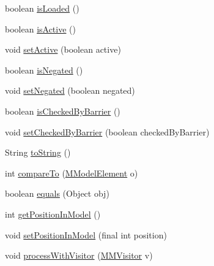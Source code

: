 \begin{DoxyCompactItemize}
\item 
boolean \hyperlink{classorg_1_1tzi_1_1use_1_1uml_1_1mm_1_1_m_class_invariant_aa6222605ae8ae2445dbf595195d75cd5}{is\-Loaded} ()
\item 
boolean \hyperlink{classorg_1_1tzi_1_1use_1_1uml_1_1mm_1_1_m_class_invariant_a9367bf1d958b1802cc3c4596fd547b74}{is\-Active} ()
\item 
void \hyperlink{classorg_1_1tzi_1_1use_1_1uml_1_1mm_1_1_m_class_invariant_a6545ffaa1a5b6d5d6109db60a520088a}{set\-Active} (boolean active)
\item 
boolean \hyperlink{classorg_1_1tzi_1_1use_1_1uml_1_1mm_1_1_m_class_invariant_a8d3e803f38fd9df1909512b6233e22a5}{is\-Negated} ()
\item 
void \hyperlink{classorg_1_1tzi_1_1use_1_1uml_1_1mm_1_1_m_class_invariant_ab48032170a88a4c9e8a4d839a2ac3619}{set\-Negated} (boolean negated)
\item 
boolean \hyperlink{classorg_1_1tzi_1_1use_1_1uml_1_1mm_1_1_m_class_invariant_a33e8cd4e797a8c7a1c43028661dc38a4}{is\-Checked\-By\-Barrier} ()
\item 
void \hyperlink{classorg_1_1tzi_1_1use_1_1uml_1_1mm_1_1_m_class_invariant_a9c54908eddd23901466c190613dfd222}{set\-Checked\-By\-Barrier} (boolean checked\-By\-Barrier)
\item 
String \hyperlink{classorg_1_1tzi_1_1use_1_1uml_1_1mm_1_1_m_class_invariant_aab7d69e1082d279ea143e6b1ded7c0d2}{to\-String} ()
\item 
int \hyperlink{classorg_1_1tzi_1_1use_1_1uml_1_1mm_1_1_m_class_invariant_a9fe635bb815a0c7766fad37debf402e5}{compare\-To} (\hyperlink{interfaceorg_1_1tzi_1_1use_1_1uml_1_1mm_1_1_m_model_element}{M\-Model\-Element} o)
\item 
boolean \hyperlink{classorg_1_1tzi_1_1use_1_1uml_1_1mm_1_1_m_class_invariant_ac250bca316df8ef4c44627c0559e4d38}{equals} (Object obj)
\item 
int \hyperlink{classorg_1_1tzi_1_1use_1_1uml_1_1mm_1_1_m_class_invariant_a667c16649b69d03c67d5c088eeb4af83}{get\-Position\-In\-Model} ()
\item 
void \hyperlink{classorg_1_1tzi_1_1use_1_1uml_1_1mm_1_1_m_class_invariant_a4a2c16931a7e2f89c5288946fd3d69cd}{set\-Position\-In\-Model} (final int position)
\item 
void \hyperlink{classorg_1_1tzi_1_1use_1_1uml_1_1mm_1_1_m_class_invariant_a32c908c001dfb3ddb1fe655075702dbc}{process\-With\-Visitor} (\hyperlink{interfaceorg_1_1tzi_1_1use_1_1uml_1_1mm_1_1_m_m_visitor}{M\-M\-Visitor} v)
\end{DoxyCompactItemize}
